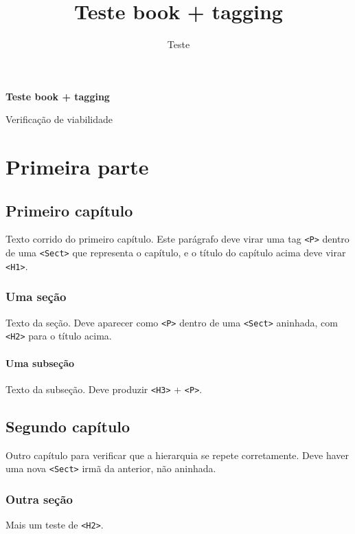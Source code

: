 \documentclass[11pt,a5paper,twoside,openright]{book}
\title{Teste book + tagging}
\author{Teste}
\begin{document}
\frontmatter

\begin{titlepage}
    \centering
    \vspace*{\fill}
    {\huge\bfseries Teste book + tagging\par}
    \vspace{2\baselineskip}
    {\large Verificação de viabilidade\par}
    \vfill
\end{titlepage}

\tableofcontents

\mainmatter

\part{Primeira parte}

\chapter{Primeiro capítulo}

Texto corrido do primeiro capítulo. Este parágrafo deve virar
uma tag \texttt{<P>} dentro de uma \texttt{<Sect>} que representa
o capítulo, e o título do capítulo acima deve virar \texttt{<H1>}.

\section{Uma seção}

Texto da seção. Deve aparecer como \texttt{<P>} dentro de uma
\texttt{<Sect>} aninhada, com \texttt{<H2>} para o título acima.

\subsection{Uma subseção}

Texto da subseção. Deve produzir \texttt{<H3>} + \texttt{<P>}.

\chapter{Segundo capítulo}

Outro capítulo para verificar que a hierarquia se repete
corretamente. Deve haver uma nova \texttt{<Sect>} irmã da
anterior, não aninhada.

\section{Outra seção}

Mais um teste de \texttt{<H2>}.
\end{document}
